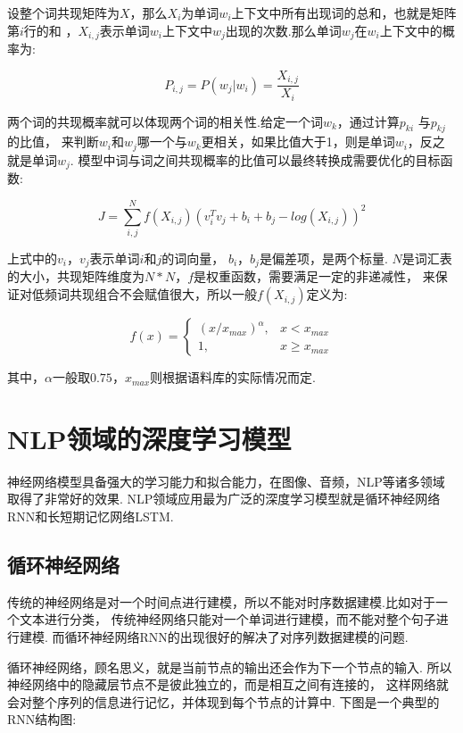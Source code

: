 \documentclass[bachelor,adobefonts]{jnuthesis}
\begin{document}
设整个词共现矩阵为$X$，那么$X_{i}$为单词$w_{i}$上下文中所有出现词的总和，也就是矩阵第$i$行的和
，$X_{i,j}$表示单词$w_{i}$上下文中$w_{j}$出现的次数.那么单词$w_{j}$在$w_{i}$上下文中的概率为:

\begin{equation}
  P_{i,j} = P(w_{j}|w_{i}) = \frac{X_{i,j}}{X_{i}}
\end{equation}

两个词的共现概率就可以体现两个词的相关性.给定一个词$w_{k}$，通过计算$p_{ki}$ 与$p_{kj}$的比值，
来判断$w_{i}$和$w_{j}$哪一个与$w_{k}$更相关，如果比值大于1，则是单词$w_{i}$，反之就是单词$w_{j}$.
模型中词与词之间共现概率的比值可以最终转换成需要优化的目标函数:

\begin{equation}
  J = \sum_{i,j}^{N}f(X_{i,j})(v_{i}^{T}v_{j}+b_{i}+b_{j}-log(X_{i,j}))^2
\end{equation}

上式中的$v_{i}$，$v_{j}$表示单词$i$和$j$的词向量，
$b_{i}$，$b_{j}$是偏差项，是两个标量.
$N$是词汇表的大小，共现矩阵维度为$N*N$，$f$是权重函数，需要满足一定的非递减性，
来保证对低频词共现组合不会赋值很大，所以一般$f(X_{i,j})$定义为:

\begin{equation}
  f(x) = 
  \left\{
    \begin{array}{lr}
      (x/x_{max})^{\alpha}, & x<x_{max} \\
      1, & x \ge x_{max} 
    \end{array}
    \right.
\end{equation}

其中，$\alpha$一般取$0.75$，$x_{max}$则根据语料库的实际情况而定.


\section{NLP领域的深度学习模型}
神经网络模型具备强大的学习能力和拟合能力，在图像、音频，NLP等诸多领域取得了非常好的效果.
NLP领域应用最为广泛的深度学习模型就是循环神经网络RNN和长短期记忆网络LSTM.

\subsection{循环神经网络}
传统的神经网络是对一个时间点进行建模，所以不能对时序数据建模.比如对于一个文本进行分类，
传统神经网络只能对一个单词进行建模，而不能对整个句子进行建模.
而循环神经网络RNN的出现很好的解决了对序列数据建模的问题.

循环神经网络，顾名思义，就是当前节点的输出还会作为下一个节点的输入.
所以神经网络中的隐藏层节点不是彼此独立的，而是相互之间有连接的，
这样网络就会对整个序列的信息进行记忆，并体现到每个节点的计算中.
下图是一个典型的RNN结构图:
\end{document}
